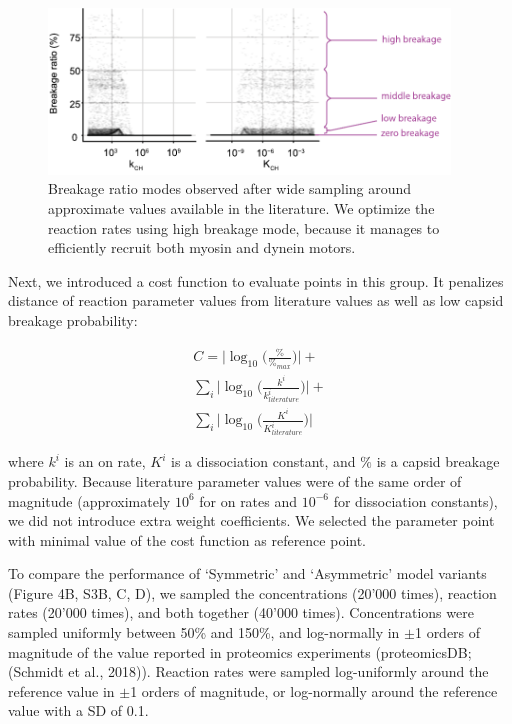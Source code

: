 \begin{figure}
\begin{center}
\includegraphics[width=0.95\textwidth, trim={0cm 0cm 0cm 0cm}, clip]{D_chapters/2_ReactionModel/ratesSelection.pdf}
\caption[Breakage ratio modes]%
{Breakage ratio modes observed after  wide sampling around approximate values available in the literature. We optimize the reaction rates using high breakage mode, because it manages to efficiently recruit both myosin and dynein motors.}
\label{figure:BreakageModesRatesSelection}
\end{center}
\end{figure}

Next, we introduced a cost function to evaluate points in this group. It penalizes distance of reaction parameter values from literature values as well as low capsid breakage probability:

\begin{equation}
\begin{split}
C = \big| \log_{10} \big( \frac{\%}{\%_{max}} \big) \big| +\\
\sum_{i} \big| \log_{10} \big( \frac{k^i}{k^i_{literature}} \big) \big| +\\
\sum_{i} \big| \log_{10} \big( \frac{K^i}{K^i_{literature}} \big) \big|
\end{split}
\end{equation}

where $k^i$ is an on rate, $K^i$ is a dissociation constant, and $\%$ is a capsid breakage probability. Because literature parameter values were of the same order of magnitude (approximately $10^6$ for on rates and $10^{-6}$ for dissociation constants), we did not introduce extra weight coefficients. We selected the parameter point with minimal value of the cost function as reference point.

To compare the performance of ‘Symmetric’ and ‘Asymmetric’ model variants (Figure 4B, S3B, C, D), we sampled the concentrations (20’000 times), reaction rates (20’000 times), and both together (40’000 times). Concentrations were sampled uniformly between 50\% and 150\%, and log-normally in $\pm$1 orders of magnitude of the value reported in proteomics experiments (proteomicsDB; (Schmidt et al., 2018)). Reaction rates were sampled log-uniformly around the reference value in $\pm$1 orders of magnitude, or log-normally around the reference value with a SD of 0.1.


